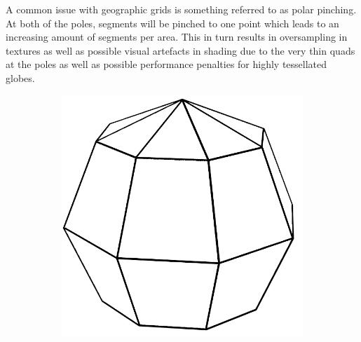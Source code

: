 A common issue with geographic grids is something referred to as polar pinching. At both of the poles, segments will be pinched to one point which leads to an increasing amount of segments per area. This in turn results in oversampling in textures as well as possible visual artefacts in shading due to the very thin quads at the poles as well as possible performance penalties for highly tessellated globes.

\begin{figure}
    \centering
    \begin{subfigure}[b]{0.2\textwidth}
        \includegraphics[width=\textwidth]{figures/tessellation/tessellation_geo1.png}
    \end{subfigure}
    ~ %
    \begin{subfigure}[b]{0.2\textwidth}

\end{subfigure}
\end{figure}
